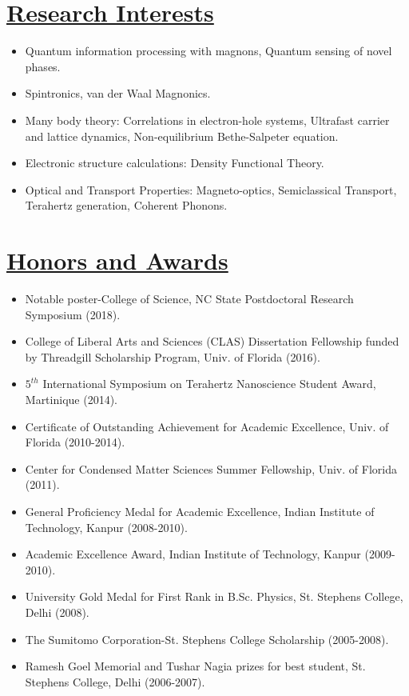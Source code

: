 \documentclass[12pt]{article}
\begin{document}
\section*{\underline{Research Interests}}
\begin{itemize}
\itemsep-0.05em
\item Quantum information processing with magnons, Quantum sensing of novel phases.
\item Spintronics, van der Waal Magnonics.
\item Many body theory: Correlations in electron-hole systems, Ultrafast carrier and lattice dynamics, Non-equilibrium Bethe-Salpeter equation.
\item Electronic structure calculations: Density Functional Theory.
\item Optical and Transport Properties: Magneto-optics, Semiclassical Transport, Terahertz generation, Coherent Phonons.   
\end{itemize}

\section*{\underline{Honors and Awards}}
\begin{itemize}
\itemsep-0.1em
\item Notable poster-College of Science, NC State Postdoctoral Research Symposium (2018).
\item College of Liberal Arts and Sciences (CLAS) Dissertation Fellowship funded by Threadgill Scholarship Program, Univ. of Florida (2016).
\item $5^{th}$ International Symposium on Terahertz Nanoscience Student Award, Martinique (2014).
\item Certificate of Outstanding Achievement for Academic Excellence, Univ. of Florida (2010-2014).
\item Center for Condensed Matter Sciences Summer Fellowship, Univ. of Florida (2011).
\item General Proficiency Medal for Academic Excellence, Indian Institute of Technology, Kanpur (2008-2010).
\item Academic Excellence Award, Indian Institute of Technology, Kanpur (2009-2010).
\item University Gold Medal for First Rank in B.Sc. Physics, St. Stephens College, Delhi (2008).
\item The Sumitomo Corporation-St. Stephens College Scholarship (2005-2008).
\item Ramesh Goel Memorial and Tushar Nagia prizes for best student,  St. Stephens College, Delhi (2006-2007). 
\end{itemize}
\end{document}
